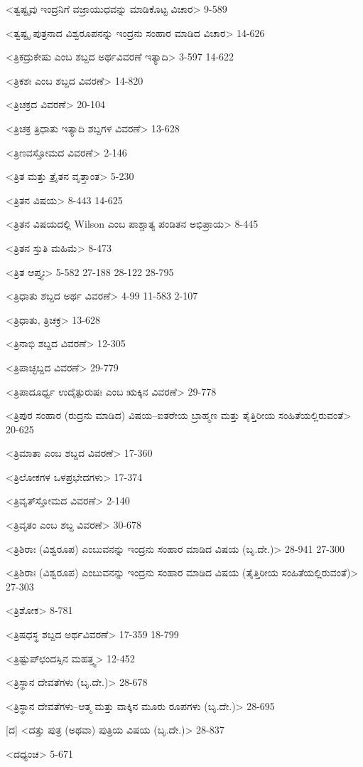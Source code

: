 <ತ್ವಷ್ಟೃವು ಇಂದ್ರನಿಗೆ ವಜ್ರಾಯುಧವನ್ನು ಮಾಡಿಕೊಟ್ಟ ವಿಚಾರ>
9-589

<ತ್ವಷ್ಟೃ ಪುತ್ರನಾದ ವಿಶ್ವರೂಪನನ್ನು ಇಂದ್ರನು ಸಂಹಾರ ಮಾಡಿದ ವಿಚಾರ>
14-626

<ತ್ರಿಕದ್ರುಕೇಷು ಎಂಬ ಶಬ್ದದ ಅರ್ಥವಿವರಣೆ ಇತ್ಯಾದಿ>
3-597
14-622

<ತ್ರಿಕಶಃ ಎಂಬ ಶಬ್ದದ ವಿವರಣೆ>
14-820

<ತ್ರಿಚಕ್ರದ ವಿವರಣೆ>
20-104

<ತ್ರಿಚಕ್ರ ತ್ರಿಧಾತು ಇತ್ಯಾದಿ ಶಬ್ದಗಳ ವಿವರಣೆ>
13-628

<ತ್ರಿಣವಸ್ತೋಮದ ವಿವರಣೆ>
2-146

<ತ್ರಿತ ಮತ್ತು ತ್ರೈತನ ವೃತ್ತಾಂತ>
5-230

<ತ್ರಿತನ ವಿಷಯ>
8-443
14-625

<ತ್ರಿತನ ವಿಷಯದಲ್ಲಿ Wilson ಎಂಬ ಪಾಶ್ಚಾತ್ಯ ಪಂಡಿತನ ಅಭಿಪ್ರಾಯ>
8-445

<ತ್ರಿತನ ಸ್ತುತಿ ಮಹಿಮೆ>
8-473

<ತ್ರಿತ ಆಪ್ತ್ಯಃ>
5-582 
27-188 
28-122
28-795

<ತ್ರಿಧಾತು ಶಬ್ದದ ಅರ್ಥ ವಿವರಣೆ>
4-99
11-583
2-107

<ತ್ರಿಧಾತು, ತ್ರಿಚಕ್ರ>
13-628

<ತ್ರಿನಾಭಿ ಶಬ್ದದ ವಿವರಣೆ>
12-305

<ತ್ರಿಪಾಚ್ಛಬ್ದದ ವಿವರಣೆ>
29-779

<ತ್ರಿಪಾದೂರ್ಧ್ವ ಉದೈತ್ಪುರುಷಃ ಎಂಬ ಋಕ್ಕಿನ ವಿವರಣೆ>
29-778

<ತ್ರಿಪುರ ಸಂಹಾರ (ರುದ್ರನು ಮಾಡಿದ) ವಿಷಯ–ಐತರೇಯ ಬ್ರಾಹ್ಮಣ ಮತ್ತು ತೈತ್ತಿರೀಯ ಸಂಹಿತೆಯಲ್ಲಿರುವಂತೆ>
20-625

<ತ್ರಿಮಾತಾ ಎಂಬ ಶಬ್ದದ ವಿವರಣೆ>
17-360

<ತ್ರಿಲೋಕಗಳ ಒಳಪ್ರಭೇದಗಳು>
17-374

<ತ್ರಿವೃತ್‍ಸ್ತೋಮದ ವಿವರಣೆ>
2-140

<ತ್ರಿವೃತಂ ಎಂಬ ಶಬ್ದ ವಿವರಣೆ>
30-678

<ತ್ರಿಶಿರಾಃ (ವಿಶ್ವರೂಪ) ಎಂಬುವನನ್ನು ಇಂದ್ರನು ಸಂಹಾರ ಮಾಡಿದ ವಿಷಯ (ಬೃ.ದೇ.)>
28-941 
27-300

<ತ್ರಿಶಿರಾಃ (ವಿಶ್ವರೂಪ) ಎಂಬುವನನ್ನು ಇಂದ್ರನು ಸಂಹಾರ ಮಾಡಿದ ವಿಷಯ (ತೈತ್ತಿರೀಯ ಸಂಹಿತೆಯಲ್ಲಿರುವಂತೆ)>
27-303

<ತ್ರಿಶೋಕ>
8-781

<ತ್ರಿಷಧಸ್ಥ ಶಬ್ದದ ಅರ್ಥವಿವರಣೆ>
17-359 
18-799

<ತ್ರಿಷ್ಟುಪ್‍ಛಂದಸ್ಸಿನ ಮಹತ್ತ್ವ>
12-452

<ತ್ರಿಸ್ಥಾನ ದೇವತೆಗಳು (ಬೃ.ದೇ.)>
28-678

<ತ್ರಿಸ್ಥಾನ ದೇವತೆಗಳು–ಆತ್ಮ ಮತ್ತು ವಾಕ್ಕಿನ ಮೂರು ರೂಪಗಳು (ಬೃ.ದೇ.)>
28-695

[ದ]
<ದತ್ತು ಪುತ್ರ (ಅಥವಾ) ಪುತ್ರಿಯ ವಿಷಯ (ಬೃ.ದೇ.)>
28-837

<ದಧ್ಯಂಚ>
5-671

